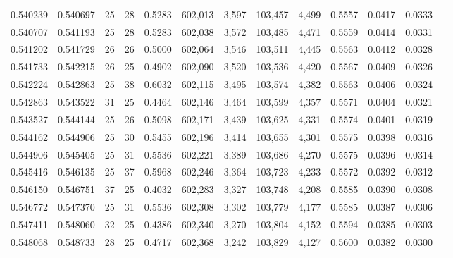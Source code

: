 \begin{tabular}{rrrrrrrrrrrrr}
0.540239 & 0.540697 &    25 &  28 &                                     0.5283 & 602,013 &   3,597 & 103,457 &   4,499 & 0.5557 & 0.0417 & 0.0333 \\
0.540707 & 0.541193 &    25 &  28 &                                     0.5283 & 602,038 &   3,572 & 103,485 &   4,471 & 0.5559 & 0.0414 & 0.0331 \\
0.541202 & 0.541729 &    26 &  26 &                                     0.5000 & 602,064 &   3,546 & 103,511 &   4,445 & 0.5563 & 0.0412 & 0.0328 \\
0.541733 & 0.542215 &    26 &  25 &                                     0.4902 & 602,090 &   3,520 & 103,536 &   4,420 & 0.5567 & 0.0409 & 0.0326 \\
0.542224 & 0.542863 &    25 &  38 &                                     0.6032 & 602,115 &   3,495 & 103,574 &   4,382 & 0.5563 & 0.0406 & 0.0324 \\
0.542863 & 0.543522 &    31 &  25 &                                     0.4464 & 602,146 &   3,464 & 103,599 &   4,357 & 0.5571 & 0.0404 & 0.0321 \\
0.543527 & 0.544144 &    25 &  26 &                                     0.5098 & 602,171 &   3,439 & 103,625 &   4,331 & 0.5574 & 0.0401 & 0.0319 \\
0.544162 & 0.544906 &    25 &  30 &                                     0.5455 & 602,196 &   3,414 & 103,655 &   4,301 & 0.5575 & 0.0398 & 0.0316 \\
0.544906 & 0.545405 &    25 &  31 &                                     0.5536 & 602,221 &   3,389 & 103,686 &   4,270 & 0.5575 & 0.0396 & 0.0314 \\
0.545416 & 0.546135 &    25 &  37 &                                     0.5968 & 602,246 &   3,364 & 103,723 &   4,233 & 0.5572 & 0.0392 & 0.0312 \\
0.546150 & 0.546751 &    37 &  25 &                                     0.4032 & 602,283 &   3,327 & 103,748 &   4,208 & 0.5585 & 0.0390 & 0.0308 \\
0.546772 & 0.547370 &    25 &  31 &                                     0.5536 & 602,308 &   3,302 & 103,779 &   4,177 & 0.5585 & 0.0387 & 0.0306 \\
0.547411 & 0.548060 &    32 &  25 &                                     0.4386 & 602,340 &   3,270 & 103,804 &   4,152 & 0.5594 & 0.0385 & 0.0303 \\
0.548068 & 0.548733 &    28 &  25 &                                     0.4717 & 602,368 &   3,242 & 103,829 &   4,127 & 0.5600 & 0.0382 & 0.0300 \\

\end{tabular}
